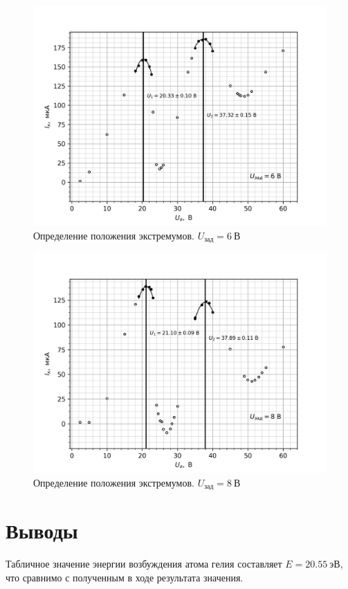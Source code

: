 \documentclass[14pt, a4paper]{report}
\begin{document}
\begin{figure}[H]
\centering
\includegraphics[scale=0.9]{../images/521-6}
\caption{Определение положения экстремумов. $U_{зад}=6\ \text{В}$}
\end{figure}

\begin{figure}[H]
\centering
\includegraphics[scale=0.9]{../images/521-7}
\caption{Определение положения экстремумов. $U_{зад}=8\ \text{В}$}
\end{figure}

\section{Выводы}

Табличное значение энергии возбуждения атома гелия составляет $E=20.55\ эВ$, что сравнимо с полученным в ходе результата значения. 
\end{document}
